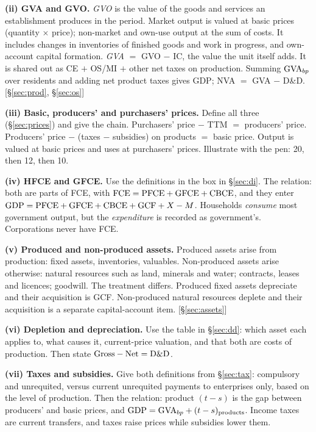 \textbf{(ii) GVA and GVO.} \emph{GVO} is the value of the goods and services an establishment
produces in the period. Market output is valued at basic prices (quantity $\times$ price);
non-market and own-use output at the sum of costs. It includes changes in inventories of finished
goods and work in progress, and own-account capital formation. \emph{GVA} $=$ GVO $-$ IC, the
value the unit itself adds. It is shared out as CE $+$ OS/MI $+$ other net taxes on production.
Summing $\mathrm{GVA}_{bp}$ over residents and adding net product taxes gives GDP; NVA $=$ GVA $-$
D\&D. [\S\ref{sec:prod}, \S\ref{sec:os}]

\textbf{(iii) Basic, producers' and purchasers' prices.} Define all three (\S\ref{sec:prices}) and
give the chain. Purchasers' price $-$ TTM $=$ producers' price. Producers' price $-$ (taxes $-$
subsidies) on products $=$ basic price. Output is valued at basic prices and uses at purchasers'
prices. Illustrate with the pen: 20, then 12, then 10.

\textbf{(iv) HFCE and GFCE.} Use the definitions in the box in \S\ref{sec:di}. The relation:
both are parts of FCE, with $\mathrm{FCE}=\mathrm{PFCE}+\mathrm{GFCE}+\mathrm{CBCE}$, and they enter
$\mathrm{GDP}=\mathrm{PFCE}+\mathrm{GFCE}+\mathrm{CBCE}+\mathrm{GCF}+X-M$. Households \emph{consume} most government
output, but the \emph{expenditure} is recorded as government's. Corporations never have FCE.

\textbf{(v) Produced and non-produced assets.} Produced assets arise from production: fixed
assets, inventories, valuables. Non-produced assets arise otherwise: natural resources such as
land, minerals and water; contracts, leases and licences; goodwill. The treatment differs.
Produced fixed assets depreciate and their acquisition is GCF. Non-produced natural resources
deplete and their acquisition is a separate capital-account item. [\S\ref{sec:assets}]

\textbf{(vi) Depletion and depreciation.} Use the table in \S\ref{sec:dd}: which asset each
applies to, what causes it, current-price valuation, and that both are costs of production.
Then state $\text{Gross}-\text{Net}=\mathrm{D\&D}$.

\textbf{(vii) Taxes and subsidies.} Give both definitions from \S\ref{sec:tax}: compulsory and
unrequited, versus current unrequited payments to enterprises only, based on the level of
production. Then the relation: product $(t-s)$ is the gap between producers' and basic prices, and
$\mathrm{GDP}=\mathrm{GVA}_{bp}+(t-s)_{\text{products}}$. Income taxes are current transfers, and taxes
raise prices while subsidies lower them.


